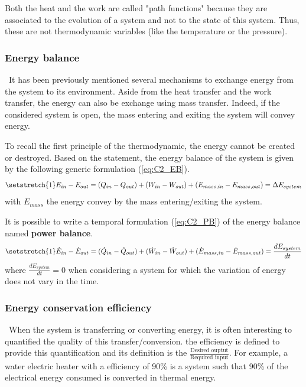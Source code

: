 Both the heat and the work are called "path functions" because they are associated to the evolution of a system and not to the state of this system. Thus, these are not thermodynamic variables (like the temperature or the pressure).

\subsubsection{Energy balance}
\quad\, It has been previously mentioned several mechanisms to exchange energy from the system to its environment. Aside from the heat transfer and the work transfer, the energy can also be exchange using mass transfer. Indeed, if the considered system is open, the mass entering and exiting the system will convey energy.

To recall the first principle of the thermodynamic, the energy cannot be created or destroyed. Based on the statement, the energy balance of the system is given by the following generic formulation (\ref{eq:C2_EB}).
\begin{equation}
\setstretch{1}
    E_{in} - E_{out} = (Q_{in} - Q_{out}) + (W_{in} - W_{out}) + (E_{mass,in} - E_{mass,out}) = \Delta E_{system} \label{eq:C2_EB}
\end{equation}
with $E_{mass}$ the energy convey by the mass entering/exiting the system.

It is possible to write a temporal formulation (\ref{eq:C2_PB}) of the energy balance named \textbf{power balance}.  
\begin{equation}
\setstretch{1}
    \dot{E}_{in} - \dot{E}_{out} = (\dot{Q}_{in} - \dot{Q}_{out}) + (\dot{W}_{in} - \dot{W}_{out}) + (\dot{E}_{mass,in} - \dot{E}_{mass,out}) = \frac{dE_{system}}{dt} \label{eq:C2_PB}
\end{equation}
where $\frac{dE_{system}}{dt}=0$ when considering a system for which the variation of energy does not vary in the time.

\subsubsection{Energy conservation efficiency}
\quad\, When the system is transferring or converting energy, it is often interesting to quantified the quality of this transfer/conversion. the efficiency is defined to provide this quantification and its definition is the
$\frac{\text{Desired ouptut}}{\text{Required input}}$. For example, a water electric heater with a efficiency of 90\% is a system such that 90\% of the electrical energy consumed is converted in thermal energy.  


